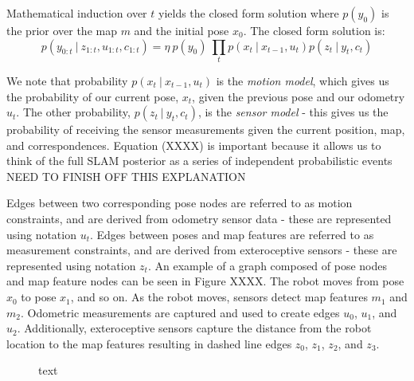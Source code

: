 \documentclass[a4paper]{article}
\begin{document}
Mathematical induction over $t$ yields the closed form solution where $p(y_0)$ is the prior over the map $m$ and the initial pose $x_0$. The closed form solution is:
\begin{equation}
p(y_{0:t} \ | \ z_{1:t}, u_{1:t}, c_{1:t}) = \eta \ p(y_0) \ \prod_{t} p(x_t \ | \ x_{t-1}, u_t) p(z_t \ | \ y_t, c_t)
\end{equation}

We note that probability $p(x_t \ | \ x_{t-1}, u_t)$ is the \textit{motion model}, which gives us the probability of our current pose, $x_t$, given the previous pose and our odometry $u_t$. The other probability, $p(z_t \ | \ y_t, c_t)$, is the \textit{sensor model} - this gives us the probability of receiving the sensor measurements given the current position, map, and correspondences. Equation (XXXX) is important because it allows us to think of the full SLAM posterior as a series of independent probabilistic events\\

NEED TO FINISH OFF THIS EXPLANATION

Edges between two corresponding pose nodes are referred to as motion constraints, and are derived from odometry sensor data - these are represented using notation $u_t$. Edges between poses and map features are referred to as measurement constraints, and are derived from exteroceptive sensors - these are represented using notation $z_t$. An example of a graph composed of pose nodes and map feature nodes can be seen in Figure XXXX. The robot moves from pose $x_0$ to pose $x_1$, and so on. As the robot moves, sensors detect map features $m_1$ and $m_2$. Odometric measurements are captured and used to create edges $u_0$, $u_1$, and $u_2$. Additionally, exteroceptive sensors capture the distance from the robot location to the map features resulting in dashed line edges $z_0$, $z_1$, $z_2$, and $z_3$. 
\begin{figure}[h]
\centering
{}
\caption{text}
\end{figure}
\end{document}
